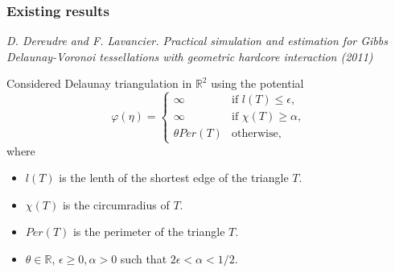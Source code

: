 \documentclass[c, 10pt]{beamer}
\begin{document}
\begin{frame}\frametitle{Existing results}
	\textit{D. Dereudre and F. Lavancier. Practical simulation and estimation for Gibbs Delaunay-Voronoi tessellations with geometric hardcore interaction (2011)}

	Considered Delaunay triangulation in $\mathbb R^2$ using the potential
\begin{equation*}
	\varphi(\eta) = 
\left\{
    \begin{array}{ll}
        \infty & \mbox{if } l(T)\leq \epsilon, \\
        \infty & \mbox{if } \chi(T)\geq \alpha, \\
        \theta Per(T) & \mbox{otherwise, }
    \end{array}
\right. 
\end{equation*}
where
\begin{itemize}
\item $l(T)$ is the lenth of the shortest edge of the triangle $T$.
\item $\chi(T)$ is the circumradius of $T$.
\item $Per(T)$ is the perimeter of the triangle $T$.
\item $\theta \in \mathbb R$, $\epsilon \geq 0, \alpha > 0$ such that $2\epsilon < \alpha < 1/2$.
\end{itemize}

\end{frame}
\end{document}
